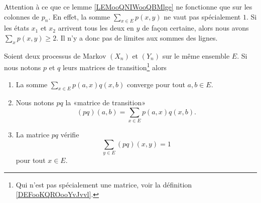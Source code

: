 \begin{remark}
	Attention à ce que ce lemme \ref{LEMooQNIWooQBMlge} ne fonctionne que sur les colonnes de \( p_n\). En effet, la somme \( \sum_{x\in E}p(x,y)\) ne vaut pas spécialement \( 1\). Si les états \( x_1\) et \( x_2\) arrivent tous les deux en \( y\) de façon certaine, alors nous avons \( \sum_xp(x,y)\geq 2\). Il n'y a donc pas de limites aux sommes des lignes.
\end{remark}

\begin{lemmaDef}         \label{LEMooZIEPooXHGnvy}
	Soient deux processus de Markov \( (X_n)\) et \( (Y_n)\) sur le même ensemble \( E\). Si nous notons \( p\) et \( q\) leurs matrices de transition\footnote{Qui n'est pas spécialement une matrice, voir la définition \ref{DEFooKQROooYvJvvl}.} alors
	\begin{enumerate}
		\item       \label{ITEMooWNWXooCKOYpE}
		      La somme \( \sum_{x\in E}p(a,x)q(x,b)\) converge pour tout \( a,b\in E\).
		\item       \label{ITEMooEZIEooFEbwhj}
		      Nous notons \( pq\) la «matrice de transition»
		      \begin{equation}
			      (pq)(a,b)=\sum_{x\in E}p(a,x)q(x,b).
		      \end{equation}
		\item       \label{ITEMooKEFXooMLREkO}
		      La matrice \( pq\) vérifie
		      \begin{equation}
			      \sum_{y\in E}(pq)(x,y)=1
		      \end{equation}
		      pour tout \( x\in E\).
	\end{enumerate}
\end{lemmaDef}

